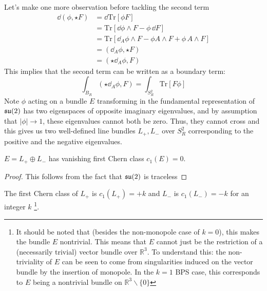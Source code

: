 	
	Let's make one more observation before tackling the second term
	\begin{equation}
		\begin{aligned}
			\dd(\phi, \star F) &= \dd \mathrm{Tr}[\phi F]\\
			&= \mathrm{Tr}[\dd\phi \wedge F - \phi\, \dd F]\\
			& = \mathrm{Tr}[\dd_A \phi \wedge F - \phi A \wedge F + \phi\, A \wedge F] \\
			&= (\dd_A \phi, \star F)\\
			&= (\star \dd_A \phi, F)
		\end{aligned}
	\end{equation}	
	This implies that the second term can be written as a boundary term:
	\begin{equation*}
		\int_{B_R} (\star \dd_A \phi, F) = \int_{S^2_R} \mathrm{Tr}[F \phi]
	\end{equation*}
	Note $\phi$ acting on a bundle $E$ transforming in the fundamental representation of $\frak{su}(2)$ has two eigenspaces of opposite imaginary eigenvalues, and by assumption that $|\phi|\to 1$, these eigenvalues cannot both be zero. Thus, they cannot cross and this gives us two well-defined line bundles $L_+, L_-$ over $S^2_R$ corresponding to the positive and the negative eigenvalues.
	\begin{prop}
		$E = L_+ \oplus L_-$ has vanishing first Chern class $c_1(E) = 0$.
	\end{prop}
	\begin{proof}
		This follows from the fact that $\frak{su}(2)$ is traceless
	\end{proof}
	\begin{cor}
		The first Chern class of $L_+$ is $c_1(L_+) = +k$ and $L_-$ is $c_1(L_-) = -k$ for an integer $k$
		\footnote{It should be noted that (besides the non-monopole case of $k = 0$), this makes the bundle $E$ nontrivial. This means that $E$ cannot just be the restriction of a (necessarily trivial) vector bundle over $\mathbb R^3$. To understand this: the non-triviality of $E$ can be seen to come from singularities induced on the vector bundle by the insertion of monopole. In the $k=1$ BPS case, this corresponds to $E$ being a nontrivial bundle on $\mathbb R^3 \backslash \{0\}$}.
	\end{cor}
